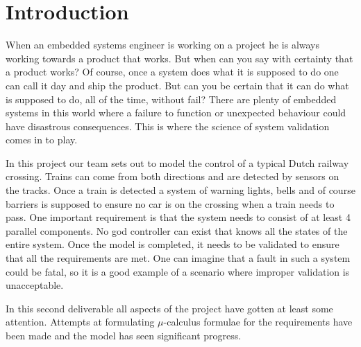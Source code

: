 \documentclass[final]{report}
\begin{document}
\chapter{Introduction}
When an embedded systems engineer is working on a project he is always working towards a product that works.
But when can you say with certainty that a product works? Of course, once a system does what it is supposed to do one can call it day and ship the product.
But can you be certain that it can do what is supposed to do, all of the time, without fail? There are plenty of embedded systems in this world where a failure to function or unexpected behaviour could have disastrous consequences.
This is where the science of system validation comes in to play.

In this project our team sets out to model the control of a typical Dutch railway crossing.
Trains can come from both directions and are detected by sensors on the tracks.
Once a train is detected a system of warning lights, bells and of course barriers is supposed to ensure no car is on the crossing when a train needs to pass.
One important requirement is that the system needs to consist of at least 4 parallel components.
No god controller can exist that knows all the states of the entire system.
Once the model is completed, it needs to be validated to ensure that all the requirements are met.
One can imagine that a fault in such a system could be fatal, so it is a good example of a scenario where improper validation is unacceptable.

In this second deliverable all aspects of the project have gotten at least some attention. Attempts at formulating $\mu$-calculus formulae for the requirements have been made and the model has seen significant progress.
\end{document}
